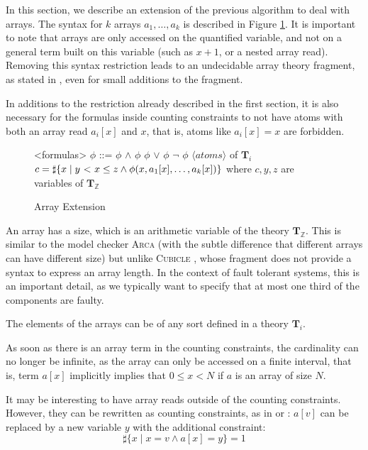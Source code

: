 
In this section, we describe an extension of the previous algorithm to
deal with arrays. The syntax for $k$ arrays $a_1, \ldots, a_k$ is
described in Figure \ref{syntaxarray}. It is important to note that
arrays are only accessed on the quantified variable, and not on a
general term built on this variable (such as $x + 1$, or a nested
array read). Removing this syntax restriction leads to an undecidable
array theory fragment, as stated in
\cite{bradley2006s}, even for small additions to the
fragment.

In additions to the restriction already described in the first section, it is also necessary for the
formulas inside counting constraints to not have atoms with both an array read $a_i[x]$ and $x$,
that is, atoms like $a_i[x] = x$ are forbidden.

\begin{figure}[h]
\begin{grammar}

<formulas> $\phi$ ::= $\phi$ $\land$ $\phi$
\alt $\phi$ $\lor$ $\phi$
\alt $\lnot$ $\phi$
\alt $\langle atoms\rangle$ of $\mathbf{T}_i$
\alt $c = \sharp\{ x \mid y\ \text{\textless}\ x \le z \land \phi(x, a_1[x], \ldots, a_k[x]) \}$ where $c, y, z$ are variables of $\mathbf{T}_\mathbb{Z}$

\end{grammar}
\caption{Array Extension}
\label{syntaxarray}
\end{figure}


An array has a size, which is an arithmetic variable of the theory
$\mathbf{T}_\mathbb{Z}$. This is similar to the model checker \textsc{Arca}
\cite{AlbertiGP16} (with the subtle difference that
different arrays can have different size) but unlike \textsc{Cubicle}
\cite{ConchonGKMZ12}, whose fragment does not
provide a syntax to express an array length. In the context of fault
tolerant systems, this is an important detail, as we typically want to
specify that at most one third of the components are faulty.

The elements of the arrays can be of any sort defined in a theory $\mathbf{T}_i$.

As soon as there is an array term in the counting constraints, the
cardinality can no longer be infinite, as the array can only be accessed
on a finite interval, that is, term $a[x]$ implicitly implies that $0 \le x < N$ if $a$ is an array of size $N$.

It may be interesting to have array reads outside of the counting
constraints. However, they can be rewritten as counting constraints, as in
\cite{bradley2006s} or
\cite{AlbertiGP16}: $a[v]$ can be replaced by a new variable $y$ with the additional constraint:
\begin{equation}
\sharp\{x\mid x = v \land a[x] = y\} = 1
\end{equation}

